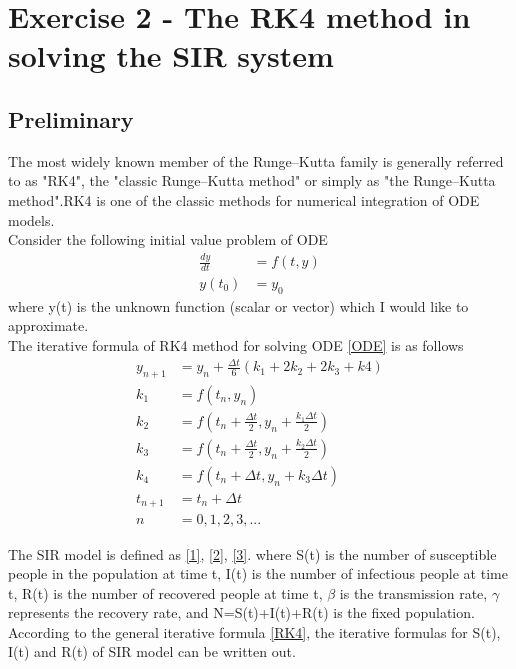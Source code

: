 \documentclass[a4paper]{article}
\begin{document}

\newpage
\tableofcontents
\newpage

\section{Exercise 2 - The RK4 method in solving the SIR system}
        \subsection{Preliminary}
        The most widely known member of the Runge–Kutta family is generally referred to as "RK4", the "classic Runge–Kutta method" or simply as "the Runge–Kutta method".RK4 is one of the classic methods for numerical integration of ODE models. \\
        Consider the following initial value problem of ODE 
        \begin{equation}\label{ODE}
            \begin{split}
                \frac{dy}{dt} & = f(t,y) \\ 
                 y(t_0) & = y_0
            \end{split}
        \end{equation}
        where y(t) is the unknown function (scalar or vector) which I would like to approximate.\\
        The iterative formula of RK4 method for solving ODE \eqref{ODE} is as follows
        \begin{equation}\label{RK4}
            \begin{split}
                y_{n+1} & = y_n + \frac{\Delta t}{6}(k_1 + 2k_2 + 2k_3 + k4) \\
                k_1 & = f(t_n,y_n) \\
                k_2 & = f(t_n + \frac{\Delta t}{2}, y_n + \frac{k_1 \Delta t}{2}) \\
                k_3 & = f(t_n + \frac{\Delta t}{2}, y_n + \frac{k_2 \Delta t}{2}) \\
                k_4 & = f(t_n + \Delta t, y_n + k_3 \Delta t) \\
                t_{n+1} & = t_n + \Delta t \\
                n & = 0,1,2,3,...
            \end{split}
        \end{equation}
        
        \indent The SIR model is defined as \eqref{1}, \eqref{2}, \eqref{3}. where S(t) is the number of susceptible people in the population at time t, I(t) is the number of infectious people at time t, R(t) is the number of recovered people at time t, $\beta$ is the transmission rate, $\gamma$ represents the recovery rate, and N=S(t)+I(t)+R(t) is the fixed population. \\
        \indent According to the general iterative formula \eqref{RK4}, the iterative formulas for S(t), I(t) and R(t) of SIR model can be written out. 
        
\end{document}
